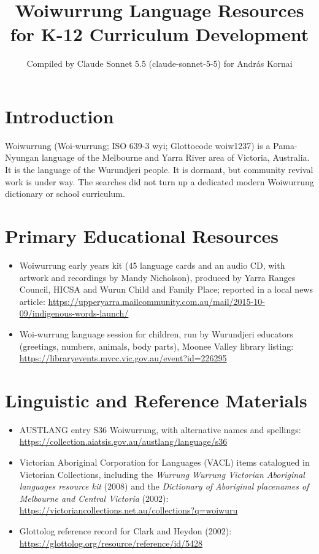 \documentclass[12pt]{article}
\title{Woiwurrung Language Resources for K-12 Curriculum Development}
\author{Compiled by Claude Sonnet 5.5 (claude-sonnet-5-5) for Andr\'as Kornai}
\date{}
\begin{document}
\maketitle

\section{Introduction}
Woiwurrung (Woi-wurrung; ISO 639-3 wyi; Glottocode woiw1237) is a Pama-Nyungan language of the Melbourne and Yarra River area of Victoria, Australia. It is the language of the Wurundjeri people. It is dormant, but community revival work is under way. The searches did not turn up a dedicated modern Woiwurrung dictionary or school curriculum.

\section{Primary Educational Resources}
\begin{itemize}
\item Woiwurrung early years kit (45 language cards and an audio CD, with artwork and recordings by Mandy Nicholson), produced by Yarra Ranges Council, HICSA and Wurun Child and Family Place; reported in a local news article: \url{https://upperyarra.mailcommunity.com.au/mail/2015-10-09/indigenous-words-launch/}
\item Woi-wurrung language session for children, run by Wurundjeri educators (greetings, numbers, animals, body parts), Moonee Valley library listing: \url{https://libraryevents.mvcc.vic.gov.au/event?id=226295}
\end{itemize}

\section{Linguistic and Reference Materials}
\begin{itemize}
\item AUSTLANG entry S36 Woiwurrung, with alternative names and spellings: \url{https://collection.aiatsis.gov.au/austlang/language/s36}
\item Victorian Aboriginal Corporation for Languages (VACL) items catalogued in Victorian Collections, including the \emph{Wurrung Wurrung Victorian Aboriginal languages resource kit} (2008) and the \emph{Dictionary of Aboriginal placenames of Melbourne and Central Victoria} (2002): \url{https://victoriancollections.net.au/collections?q=woiwuru}
\item Glottolog reference record for Clark and Heydon (2002): \url{https://glottolog.org/resource/reference/id/5428}
\end{itemize}
\end{document}
